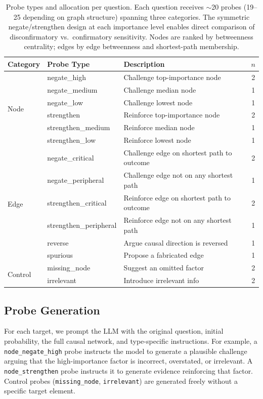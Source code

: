 \documentclass[11pt]{article}
\begin{document}
\begin{table}[t]
\centering
\small
\begin{tabular}{llp{4.2cm}c}
\toprule
\textbf{Category} & \textbf{Probe Type} & \textbf{Description} & \textbf{$n$} \\
\midrule
\multirow{6}{*}{Node}
  & negate\_high & Challenge top-importance node & 2 \\
  & negate\_medium & Challenge median node & 1 \\
  & negate\_low & Challenge lowest node & 1 \\
  & strengthen & Reinforce top-importance node & 2 \\
  & strengthen\_medium & Reinforce median node & 1 \\
  & strengthen\_low & Reinforce lowest node & 1 \\
\midrule
\multirow{6}{*}{Edge}
  & negate\_critical & Challenge edge on shortest path to outcome & 2 \\
  & negate\_peripheral & Challenge edge not on any shortest path & 1 \\
  & strengthen\_critical & Reinforce edge on shortest path to outcome & 2 \\
  & strengthen\_peripheral & Reinforce edge not on any shortest path & 1 \\
  & reverse & Argue causal direction is reversed & 1 \\
  & spurious & Propose a fabricated edge & 1 \\
\midrule
\multirow{2}{*}{Control}
  & missing\_node & Suggest an omitted factor & 2 \\
  & irrelevant & Introduce irrelevant info & 2 \\
\bottomrule
\end{tabular}
\caption{Probe types and allocation per question. Each question receives ${\sim}$20 probes (19--25 depending on graph structure) spanning three categories. The symmetric negate/strengthen design at each importance level enables direct comparison of disconfirmatory vs.\ confirmatory sensitivity. Nodes are ranked by betweenness centrality; edges by edge betweenness and shortest-path membership.}
\label{tab:probe_types}
\end{table}

\subsection{Probe Generation}
\label{sec:probes}

For each target, we prompt the LLM with the original question, initial probability, the full causal network, and type-specific instructions. For example, a \texttt{node\_negate\_high} probe instructs the model to generate a plausible challenge arguing that the high-importance factor is incorrect, overstated, or irrelevant. A \texttt{node\_strengthen} probe instructs it to generate evidence reinforcing that factor. Control probes (\texttt{missing\_node}, \texttt{irrelevant}) are generated freely without a specific target element.
\end{document}
